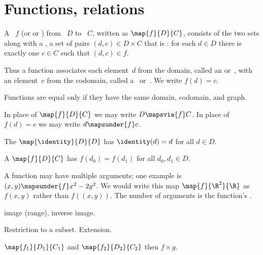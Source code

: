 \documentclass{ibl}
\begin{document}
\chapter{Functions, relations}
\begin{df}
A ~$f$ (or  or ) 
from ~$D$
to ~$C$, written as $\map{f}{D}{C}$,
consists of the two sets along with a , 
a set of pairs $(d,c)\in D\times C$ that is 
: for each $d\in D$ there is
exactly one $c\in C$ such that $(d,c)\in f$. 

Thus a function associates each element~$d$ from the domain,
called an  or~,
with an element~$c$ from the codomain, 
called a~ or~. 
We write $f(d)=c$.
\end{df}

\noindent Functions are equal only if they have the same domain, codomain,
and graph.

In place of $\map{f}{D}{C}$ we may write $D\mapsvia{f} C$.
In place of $f(d)=c$ we may write $d\mapsunder{f}c$.

\begin{df}
The  $\map{\identity}{D}{D}$ has
$\identity(d)=d$ for all $d\in D$.
\end{df}

\begin{df}
A  $\map{f}{D}{C}$ has  
$f(d_0)=f(d_1)$ for all $d_0,d_1\in D$.
\end{df}

A function may have multiple arguments; one example is 
$(x,y)\mapsunder{f}x^2-2y^2$.
We would write this map $\map{f}{\R^2}{\R}$ as 
$f(x,y)$ rather than
$f((x,y))$.
The number of arguments is the function's .


\begin{df}
  image (range), inverse image.
\end{df}

\begin{df}
Restriction to a subset. 
Extension. 
\end{df}

\begin{df}
$\map{f_1}{D_1}{C_1}$ and $\map{f_2}{D_2}{C_2}$ then $f\times g$.  
\end{df}
\end{document}
